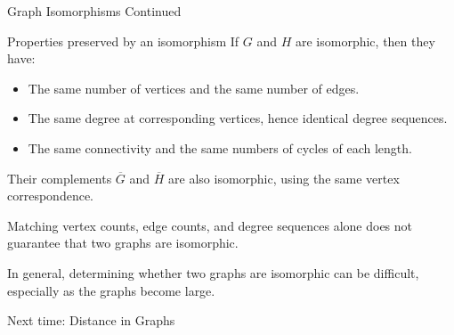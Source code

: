 \documentclass[aspectratio=169,11pt]{beamer}
\begin{document}
	\begin{frame}{Graph Isomorphisms Continued}
		\begin{block}{Properties preserved by an isomorphism}
			If $G$ and $H$ are isomorphic, then they have:
			\begin{itemize}
				\item The same number of vertices and the same number of edges.
				\item The same degree at corresponding vertices, hence identical degree sequences.
				\item The same connectivity and the same numbers of cycles of each length.
			\end{itemize}
			Their complements $\overline{G}$ and $\overline{H}$ are also isomorphic, using the same vertex correspondence.
		\end{block}
		\vspace{0.2cm}
		Matching vertex counts, edge counts, and degree sequences alone does not guarantee that two graphs are isomorphic.
		
		\medskip
		In general, determining whether two graphs are isomorphic can be difficult, especially as the graphs become large.
	\end{frame}
	
	\begin{frame}[plain]
		\centering
		{\LARGE\color{RamBlue}Next time: Distance in Graphs}
	\end{frame}
	
\end{document}
